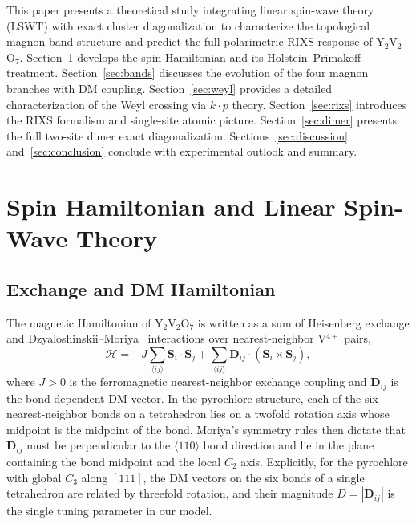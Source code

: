 \documentclass[aps,prb,twocolumn,superscriptaddress,longbibliography]{revtex4-2}
\begin{document}
This paper presents a theoretical study integrating linear spin-wave theory
(LSWT) with exact cluster diagonalization to characterize the topological
magnon band structure and predict the full polarimetric RIXS response of
Y$_2$V$_2$O$_7$.
Section~\ref{sec:hamiltonian} develops the spin Hamiltonian and its
Holstein--Primakoff treatment.
Section~\ref{sec:bands} discusses the evolution of the four magnon branches
with DM coupling.
Section~\ref{sec:weyl} provides a detailed characterization of the Weyl
crossing via $k \cdot p$ theory.
Section~\ref{sec:rixs} introduces the RIXS formalism and single-site atomic
picture.
Section~\ref{sec:dimer} presents the full two-site dimer exact diagonalization.
Sections~\ref{sec:discussion} and~\ref{sec:conclusion} conclude with
experimental outlook and summary.

\section{Spin Hamiltonian and Linear Spin-Wave Theory}
\label{sec:hamiltonian}

\subsection{Exchange and DM Hamiltonian}

The magnetic Hamiltonian of Y$_2$V$_2$O$_7$ is written as a sum of
Heisenberg exchange and Dzyaloshinskii--Moriya~\cite{Dzyaloshinskii1958,Moriya1960}
interactions over nearest-neighbor V$^{4+}$ pairs,
\begin{equation}
  \mathcal{H} = -J \sum_{\langle ij \rangle} \bm{S}_i \cdot \bm{S}_j
               + \sum_{\langle ij \rangle} \bm{D}_{ij} \cdot
                 \left(\bm{S}_i \times \bm{S}_j\right),
  \label{eq:Hfull}
\end{equation}
where $J > 0$ is the ferromagnetic nearest-neighbor exchange coupling and
$\bm{D}_{ij}$ is the bond-dependent DM vector.
In the pyrochlore structure, each of the six nearest-neighbor bonds on a
tetrahedron lies on a twofold rotation axis whose midpoint is the midpoint of
the bond.
Moriya's symmetry rules then dictate that $\bm{D}_{ij}$ must be perpendicular to
the $\langle 110 \rangle$ bond direction and lie in the plane containing the bond
midpoint and the local $C_2$ axis.
Explicitly, for the pyrochlore with global $C_3$ along $[111]$, the DM vectors
on the six bonds of a single tetrahedron are related by threefold rotation,
and their magnitude $D = |\bm{D}_{ij}|$ is the single tuning parameter in
our model.
\end{document}
